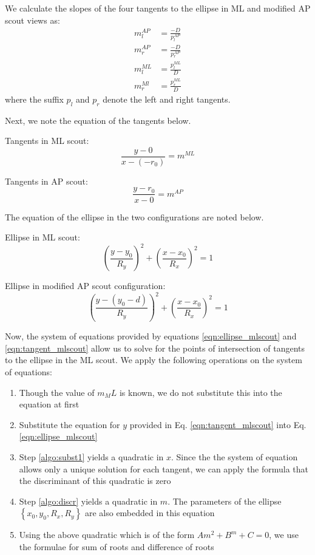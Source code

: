 \documentclass[]{spie}
\begin{document}
We calculate the slopes of the four tangents to the ellipse in ML and modified AP scout views as:
\begin{align}
m_l^{AP} &= \frac{-D}{p_l^{AP}} \nonumber \\
m_r^{AP} &= \frac{-D}{p_r^{AP}} \nonumber \\
m_l^{ML} &= \frac{p_l^{ML}}{D} \nonumber \\
m_r^{Ml} &= \frac{p_r^{ML}}{D} 
\end{align}
where the suffix $p_l$ and $p_r$ denote the left and right tangents. 

Next, we note the equation of the tangents below.

Tangents in ML scout:
\begin{equation}
\frac{y-0}{x-\left(-r_0 \right) } = m^{ML} \label{eqn:tangent_mlscout}
\end{equation}

Tangents in AP scout:
\begin{equation}
\frac{y-r_0}{x-0} = m^{AP} \label{eqn:tangent_apscout}
\end{equation}

The equation of the ellipse in the two configurations are noted below.

Ellipse in ML scout:
\begin{equation}
\left( \frac{y - y_0 }{R_y} \right)^2 + \left( \frac{x-x_0}{R_x}\right)^2 = 1 \label{eqn:ellipse_mlscout}
\end{equation}

Ellipse in modified AP scout configuration:
\begin{equation}
\left( \frac{y - \left( y_0 - d \right) }{R_y} \right)^2 + \left( \frac{x-x_0}{R_x}\right)^2 = 1 \label{eqn:ellipse_apscout}
\end{equation}

Now, the system of equations provided by equations  \ref{eqn:ellipse_mlscout} and \ref{eqn:tangent_mlscout} allow us to solve for the points of intersection of tangents to the ellipse in the ML scout. We apply the following operations on the system of equations:
\begin{enumerate}
	\item Though the value of $m_ML$ is known, we do not substitute this into the equation at first
	\item Substitute the equation for $y$ provided in Eq. \ref{eqn:tangent_mlscout} into Eq. \ref{eqn:ellipse_mlscout} \label{algo:subst1}
	\item Step \ref{algo:subst1} yields a quadratic in $x$. Since the the system of equation allows only a unique solution for each tangent, we can apply the formula that the discriminant of this quadratic is zero	 
\label{algo:discr}
	\item Step \ref{algo:discr} yields a quadratic in $m$. The parameters of the ellipse $\left\lbrace x_0, y_0, R_x, R_y \right\rbrace$ are also embedded in this equation
	\item Using the above quadratic which is of the form $A m^2 + B^m + C = 0$, we use the formulae for sum of roots and difference of roots
\end{enumerate}
\end{document}
